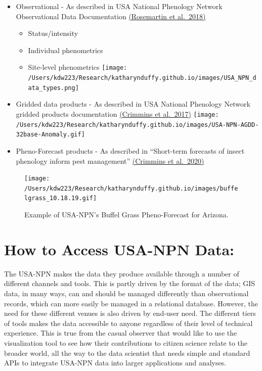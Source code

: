 \documentclass[]{book}
\providecommand{\tightlist}{%
  \setlength{\itemsep}{0pt}\setlength{\parskip}{0pt}}
\begin{document}
\begin{itemize}
\tightlist
\item
  Observational - As described in USA National Phenology Network Observational Data Documentation \href{https://pubs.usgs.gov/of/2018/1060/ofr20181060.pdf}{(Rosemartin et al.~2018)}

  \begin{itemize}
  \tightlist
  \item
    Status/intensity
  \item
    Individual phenometrics
  \item
    Site-level phenometrics
    \texttt{[image: /Users/kdw223/Research/katharynduffy.github.io/images/USA\_NPN\_data\_types.png]}
  \end{itemize}
\item
  Gridded data products - As described in USA National Phenology Network gridded products documentation \href{https://pubs.usgs.gov/of/2017/1003/ofr20171003.pdf}{(Crimmins et al.~2017)}
  \texttt{[image: /Users/kdw223/Research/katharynduffy.github.io/images/USA-NPN-AGDD-32base-Anomaly.gif]}
\item
  Pheno-Forecast products - As described in ``Short-term forecasts of insect phenology inform pest management'' \href{https://academic.oup.com/aesa/article/113/2/139/5727873}{(Crimmins et al.~2020)}
\end{itemize}

\begin{figure}
\centering
\texttt{[image: /Users/kdw223/Research/katharynduffy.github.io/images/buffelgrass\_10.18.19.gif]}
\caption{Example of USA-NPN's Buffel Grass Pheno-Forecast for Arizona.}
\end{figure}

\hypertarget{how-to-access-usa-npn-data}{%
\section{How to Access USA-NPN Data:}\label{how-to-access-usa-npn-data}}

The USA-NPN makes the data they produce available through a number of different channels and tools. This is partly driven by the format of the data; GIS data, in many ways, can and should be managed differently than observational records, which can more easily be managed in a relational database. However, the need for these different venues is also driven by end-user need. The different tiers of tools makes the data accessible to anyone regardless of their level of technical experience. This is true from the casual observer that would like to use the visualization tool to see how their contributions to citizen science relate to the broader world, all the way to the data scientist that needs simple and standard APIs to integrate USA-NPN data into larger applications and analyses.
\end{document}
